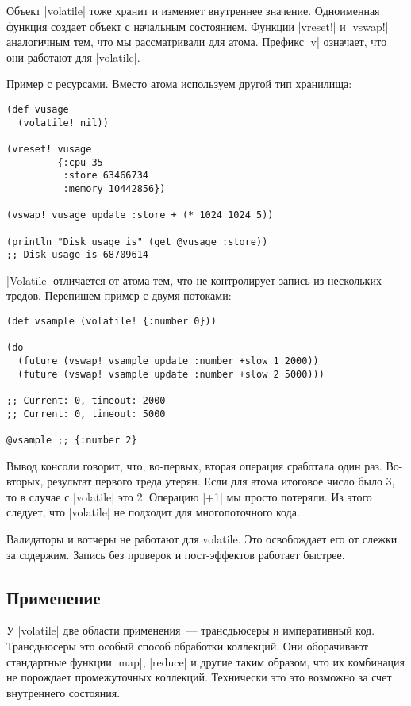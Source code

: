 Объект \spverb|volatile| тоже хранит и изменяет внутреннее значение. Одноименная
функция создает объект с начальным состоянием. Функции \spverb|vreset!| и \spverb|vswap!|
аналогичным тем, что мы рассматривали для атома. Префикс \spverb|v| означает, что они
работают для \spverb|volatile|.

Пример с ресурсами. Вместо атома используем другой тип хранилища:

\begin{verbatim}
(def vusage
  (volatile! nil))

(vreset! vusage
         {:cpu 35
          :store 63466734
          :memory 10442856})

(vswap! vusage update :store + (* 1024 1024 5))

(println "Disk usage is" (get @vusage :store))
;; Disk usage is 68709614
\end{verbatim}

\spverb|Volatile| отличается от атома тем, что не контролирует запись из нескольких
тредов. Перепишем пример с двумя потоками:

\begin{verbatim}
(def vsample (volatile! {:number 0}))

(do
  (future (vswap! vsample update :number +slow 1 2000))
  (future (vswap! vsample update :number +slow 2 5000)))

;; Current: 0, timeout: 2000
;; Current: 0, timeout: 5000

@vsample ;; {:number 2}
\end{verbatim}

Вывод консоли говорит, что, во-первых, вторая операция сработала один
раз. Во-вторых, результат первого треда утерян. Если для атома итоговое число
было 3, то в случае с \spverb|volatile| это 2. Операцию \spverb|+1| мы просто потеряли. Из
этого следует, что \spverb|volatile| не подходит для многопоточного кода.

Валидаторы и вотчеры не работают для volatile. Это освобождает его от слежки за
содержим. Запись без проверок и пост-эффектов работает быстрее.

\subsection{Применение}

У \spverb|volatile| две области применения~--- трансдьюсеры и императивный
код. Трансдьюсеры это особый способ обработки коллекций. Они оборачивают
стандартные функции \spverb|map|, \spverb|reduce| и другие таким образом, что их комбинация не
порождает промежуточных коллекций. Технически это это возможно за счет
внутреннего состояния.

